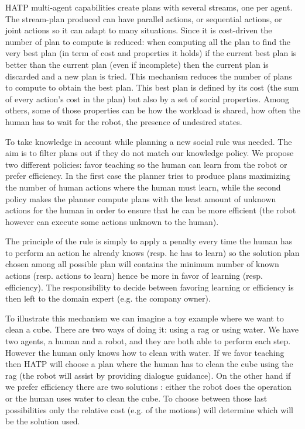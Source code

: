 \documentclass{llncs}
\begin{document}
HATP multi-agent capabilities create plans with several streams, one per agent. The stream-plan produced can have parallel actions, or sequential actions, or joint actions so it can adapt to many situations. Since it is cost-driven the number of plan to compute is reduced: when computing all the plan to find the very best plan (in term of cost and properties it holds) if the current best plan is better than the current plan (even if incomplete) then the current plan is discarded and a new plan is tried. This mechanism reduces the number of plans to compute to obtain the best plan. This best plan is defined by its cost (the sum of every action's cost in the plan) but also by a set of social properties. Among others, some of those properties can be how the workload is shared, how often the human has to wait for the robot, the presence of undesired states.

To take knowledge in account while planning a new social rule was needed. The aim is to filter plans out if they do not match our knowledge policy. We propose two different policies: favor teaching so the human can learn from the robot or prefer efficiency. In the first case the planner tries to produce plans maximizing the number of human actions where the human must learn, while the second policy makes the planner 
compute plans with the least amount of unknown actions for the human in order to ensure that he can be more efficient (the robot however can execute some actions unknown to the human).

The principle of the rule is simply to apply a penalty every time the human has to perform an action he already knows (resp. he has to learn) so the solution plan chosen among all possible plan will contains the minimum number of known actions (resp. actions to learn) hence be more in favor of learning (resp. efficiency). The responsibility to decide between favoring learning or efficiency is then left to the domain expert (e.g. the company owner).

To illustrate this mechanism we can imagine a toy example where we want to clean a cube. There are two ways of doing it: using a rag or using water. We have two agents, a human and a robot, and they are both able to perform each step. However the human only knows how to clean with water. If we favor teaching then HATP will choose a plan where the human has to clean the cube using the rag (the robot will assist by providing dialogue guidance). On the other hand if we prefer efficiency there are two solutions : either the robot does the operation or the human uses water to clean the cube. 
To choose between those last possibilities only the relative cost (e.g. of the motions) will determine which will be the solution used.
\end{document}
